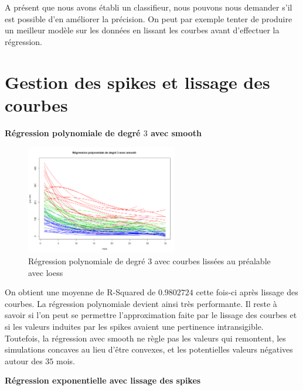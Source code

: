 \documentclass[12pt]{article}
\begin{document}
A présent que nous avons établi un classifieur, nous pouvons nous demander s'il est possible d'en améliorer la précision. On peut par exemple tenter de produire un meilleur modèle sur les données en lissant les courbes avant d'effectuer la régression.

\newpage

\section{Gestion des spikes et lissage des courbes}

\textbf{R\'egression polynomiale de degr\'e $3$ avec smooth}

\begin{figure}[H]
 \centering %
	\includegraphics[width=250px]{reg_pol3_smooth_loess}
  \caption{\label{fig:reg_pol3_smooth_loess} R\'egression polynomiale de degr\'e 3 avec courbes liss\'ees au pr\'ealable avec loess}
\end{figure}

On obtient une moyenne de R-Squared de $0.9802724$ cette fois-ci apr\`es lissage des courbes. La r\'egression polynomiale devient ainsi tr\`es performante. Il reste \`a savoir si l'on peut se permettre l'approximation faite par le lissage des courbes et si les valeurs induites par les spikes avaient une pertinence intransigible. 
\newline
Toutefois, la r\'egression avec smooth ne r\`egle pas les valeurs qui remontent, les simulations concaves au lieu d'\^etre convexes, et les potentielles valeurs n\'egatives autour des $35$ mois.

\textbf{R\'egression exponentielle avec lissage des spikes}
\end{document}
